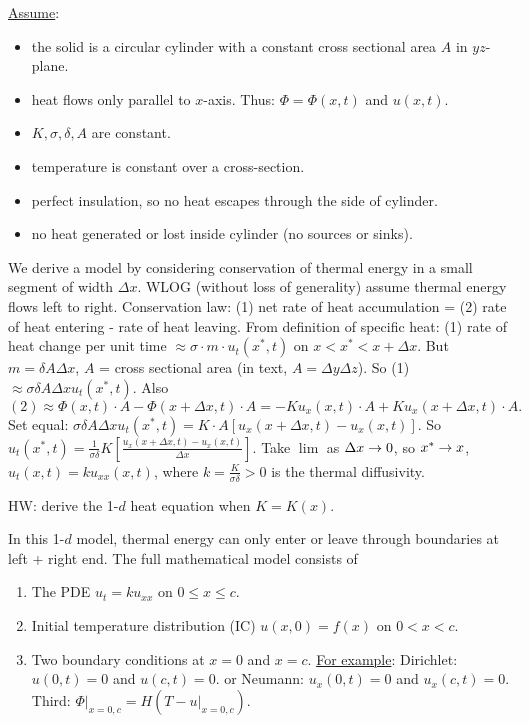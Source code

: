 \documentclass[]{article}
\begin{document}
\begin{definition}
	\underline{Assume}:
	\begin{itemize}
		\item the solid is a circular cylinder with a constant cross sectional area $A$ in $yz$-plane.
		\item heat flows only parallel to $x$-axis. Thus: $\Phi = \Phi(x,t)$ and $u(x,t)$.
		\item $K,\sigma,\delta,A$ are constant.
		\item temperature is constant over a cross-section.
		\item perfect insulation, so no heat escapes through the side of cylinder.
		\item  no heat generated or lost inside cylinder (no sources or sinks).
	\end{itemize}
\end{definition}

We derive a model by considering conservation of thermal energy in a small segment of width $\Delta x$.
WLOG (without loss of generality) assume thermal energy flows left to right.
Conservation law: (1) net rate of heat accumulation = (2) rate of heat entering - rate of heat leaving.
From definition of specific heat: (1) rate of heat change per unit time $\approx  \sigma \cdot m \cdot u_t(x^*,t)$ on $x<x^*<x+\Delta x$.
But $m=\delta A \Delta x$, $A$ = cross sectional area (in text, $A=\Delta y \Delta z$). So (1) $\approx \sigma \delta A \Delta x u_t(x^*,t)$. Also $$(2) \approx \Phi(x,t) \cdot A - \Phi(x+\Delta x,t)\cdot A = -K u_x(x,t)\cdot A + Ku_x(x+\Delta x,t)\cdot A.$$
Set equal: $\sigma \delta A \Delta x u_t(x^*,t) = K\cdot A [ u_x(x+\Delta x,t)- u_x(x,t)]$. So $u_t(x^*,t) = \frac{1}{\sigma\delta}K \left[ \frac{u_x(x+\Delta x,t) - u_x(x,t)}{\Delta x} \right]$.
Take $\lim$ as $\Delta x \rightarrow 0$, so $x^* \rightarrow x$, $u_t(x,t) = k u_{xx}(x,t)$, where $k = \frac{K}{\sigma\delta}>0$ is the thermal diffusivity.

HW: derive the 1-$d$ heat equation when $K=K(x)$.

\begin{note}
	In this 1-$d$ model, thermal energy can only enter or leave through boundaries at left + right end.
	The full mathematical model consists of
	\begin{enumerate}
		\item The PDE $u_t = ku_{xx}$ on $0\leq x\leq c$.
		\item Initial temperature distribution (IC) $u(x,0) = f(x)$ on $0<x<c$.
		\item Two boundary conditions at $x=0$ and $x=c$.
		\underline{For example}: Dirichlet: $u(0,t) = 0$ and $u(c,t)=0$.
		or Neumann: $u_x(0,t) = 0$ and $u_x(c,t) = 0$.
		Third: $\Phi \rvert_{x=0,c} = H(T-u\rvert_{x=0,c})$.
	\end{enumerate}
\end{note}
\end{document}
